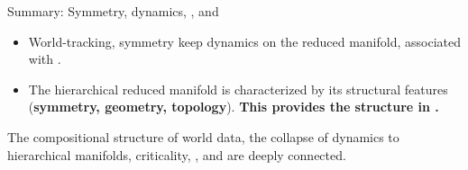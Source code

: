     
  
  
  

 


 



\begin{frame}[label=summarysymmetry]{Summary: Symmetry, dynamics, \K, and \SEP}

\begin{itemize}
    \item World-tracking, symmetry keep dynamics on the reduced manifold, associated with \SEP.
    \vfill
    \item The hierarchical reduced manifold is characterized by its structural features (\textbf{symmetry, geometry, topology}).
    \textbf{This provides the structure in \SEP.}
    \vfill
\end{itemize}

\begin{tcolorbox}[colback=cyan!40, colframe=gray!70, title={Summary}]
   The compositional structure of world data, the collapse of dynamics to hierarchical manifolds, criticality, \K, and \SEP are deeply connected.
\end{tcolorbox}

\end{frame}
